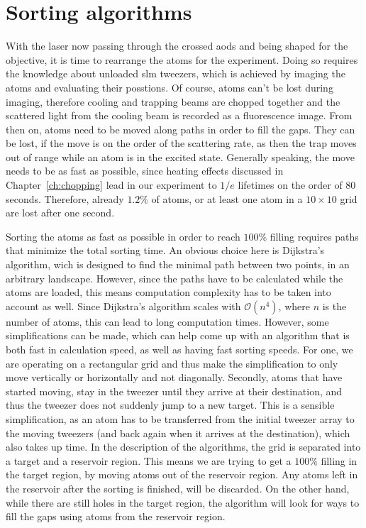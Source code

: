 \section{Sorting algorithms}

With the laser now passing through the crossed \acp{aod} and being shaped for the objective, it is time to rearrange the atoms for the experiment. Doing so requires the knowledge about unloaded \ac{slm} tweezers, which is achieved by imaging the atoms and evaluating their posstions. Of course, atoms can't be lost during imaging, therefore cooling and trapping beams are chopped together and the scattered light from the cooling beam is recorded as a fluorescence image. From then on, atoms need to be moved along paths in order to fill the gaps. They can be lost, if the move is on the order of the scattering rate, as then the trap moves out of range while an atom is in the excited state. Generally speaking, the move needs to be as fast as possible, since heating effects discussed in Chapter~\ref{ch:chopping} lead in our experiment to $1/e$ lifetimes on the order of 80 seconds. Therefore, already $1.2\%$ of atoms, or at least one atom in a $10\times10$ grid are lost after one second.

Sorting the atoms as fast as possible in order to reach $100\%$ filling requires paths that minimize the total sorting time. An obvious choice here is Dijkstra's algorithm, wich is designed to find the minimal path between two points, in an arbitrary landscape. However, since the paths have to be calculated while the atoms are loaded, this means computation complexity has to be taken into account as well. Since Dijkstra's algorithm scales with $\mathcal{O}(n^4)$\docite{}, where $n$ is the number of atoms, this can lead to long computation times. However, some simplifications can be made, which can help come up with an algorithm that is both fast in calculation speed, as well as having fast sorting speeds.
For one, we are operating on a rectangular grid and thus make the simplification to only move vertically or horizontally and not diagonally. Secondly, atoms that have started moving, stay in the tweezer until they arrive at their destination, and thus the tweezer does not suddenly jump to a new target. This is a sensible simplification, as an atom has to be transferred from the initial tweezer array to the moving tweezers (and back again when it arrives at the destination), which also takes up time. In the description of the algorithms, the grid is separated into a target and a reservoir region. This means we are trying to get a $100\%$ filling in the target region, by moving atoms out of the reservoir region. Any atoms left in the reservoir after the sorting is finished, will be discarded. On the other hand, while there are still holes in the target region, the algorithm will look for ways to fill the gaps using atoms from the reservoir region.

